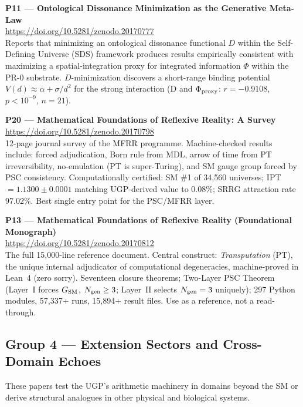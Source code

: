 \documentclass[11pt]{article}
\begin{document}
\medskip
\noindent\textbf{P11 — Ontological Dissonance Minimization as the Generative
Meta-Law}~\cite{SpivackSDS_PR0}\\
\url{https://doi.org/10.5281/zenodo.20170777}\\
Reports that minimizing an ontological dissonance functional $D$ within the
Self-Defining Universe (SDS) framework produces results empirically consistent
with maximizing a spatial-integration proxy for integrated information $\Phi$
within the PR-0 substrate.  $D$-minimization discovers a short-range binding
potential $V(d) \approx \alpha + \sigma/d^2$ for the strong interaction
(D and $\Phi_{\rm proxy}$: $r = -0.9108$, $p < 10^{-9}$, $n=21$).

\medskip
\noindent\textbf{P20 — Mathematical Foundations of Reflexive Reality: A Survey}~\cite{SpivackMathFoundationsSelfRef}\\
\url{https://doi.org/10.5281/zenodo.20170798}\\
12-page journal survey of the MFRR programme.  Machine-checked results include:
forced adjudication, Born rule from MDL, arrow of time from PT irreversibility,
no-emulation (PT is super-Turing), and SM gauge group forced by PSC consistency.
Computationally certified: SM \#1 of 34,560 universes; IPT $= 1.1300 \pm 0.0001$
matching UGP-derived value to $0.08\%$; SRRG attraction rate $97.02\%$.
Best single entry point for the PSC/MFRR layer.

\medskip
\noindent\textbf{P13 — Mathematical Foundations of Reflexive Reality
(Foundational Monograph)}~\cite{SpivackMFRR}\\
\url{https://doi.org/10.5281/zenodo.20170812}\\
The full 15,000-line reference document.  Central construct: \emph{Transputation}
(PT), the unique internal adjudicator of computational degeneracies, machine-proved
in Lean~4 (zero sorry).  Seventeen closure theorems; Two-Layer PSC Theorem
(Layer~I forces $G_{\rm SM}$, $N_{\rm gen} \ge 3$; Layer~II selects $N_{\rm gen}=3$
uniquely); 297 Python modules, 57,337+ runs, 15,894+ result files.
Use as a reference, not a read-through.

\subsection{Group 4 — Extension Sectors and Cross-Domain Echoes}

These papers test the UGP's arithmetic machinery in domains beyond the SM
or derive structural analogues in other physical and biological systems.
\end{document}
